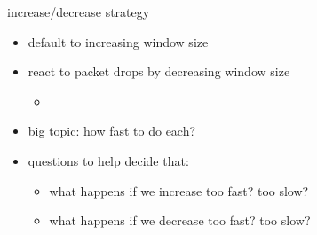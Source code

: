 \begin{frame}{increase/decrease strategy}
    \begin{itemize}
    \item default to increasing window size
    \item react to packet drops by decreasing window size
        \begin{itemize}
        \item {}
        \end{itemize}
    \vspace{.5cm}
    \item<3-> big topic: how fast to do each?
    \item<3-> questions to help decide that:
        \begin{itemize}
        \item what happens if we increase too fast? too slow?
        \item what happens if we decrease too fast? too slow?
        \end{itemize}
    \end{itemize}
\end{frame}
